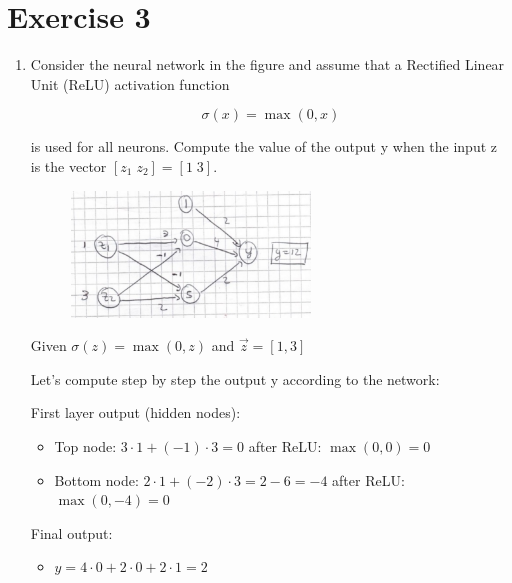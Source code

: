 \documentclass[a4paper,11pt,oneside]{book}
\begin{document}
\clearpage
\section{Exercise 3}
    \begin{enumerate}
    \item Consider the neural network in the figure and assume that a Rectified Linear Unit (ReLU) activation function

        $$\sigma(x) = \max(0,x)$$

        is used for all neurons. Compute the value of the output y when the input z is the vector $[z_1\;z_2] = [1\;3]$.

        \begin{solution}
            \begin{figure}[H]
                \centering
                \includegraphics[width=0.6\textwidth,height=0.4\textheight,keepaspectratio]{images/1_3_1_July_2019.png}
            \end{figure}
                Given $\sigma(z) = \max(0,z)$ and $\vec{z} = [1,3]$
                
                Let's compute step by step the output y according to the network:
                
                First layer output (hidden nodes):
                \begin{itemize}
                \item Top node: $3 \cdot 1 + (-1) \cdot 3 = 0$ after ReLU: $\max(0,0) = 0$
                \item Bottom node: $2 \cdot 1 + (-2) \cdot 3 = 2 - 6 = -4$ after ReLU: $\max(0,-4) = 0$
                \end{itemize}
                
                Final output:
                \begin{itemize}
                \item $y = 4 \cdot 0 + 2 \cdot 0 + 2 \cdot 1 = 2$
                \end{itemize}
                

\end{solution}
\end{enumerate}
\end{document}
